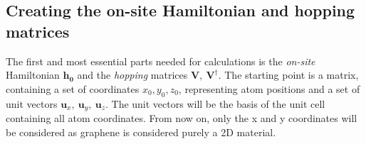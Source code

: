 \subsection{Creating the on-site Hamiltonian and hopping matrices}
The first and most essential parts needed for calculations is the \textit{on-site} Hamiltonian \(\mathbf{h_0}\) and the \textit{hopping} matrices \(\mathbf{V},\ \mathbf{V}^{\dagger}\). The starting point is a matrix, containing a set of coordinates \(x_0,y_0,z_0\), representing atom positions and a set of unit vectors \(\mathbf{u}_x, \ \mathbf{u}_y, \ \mathbf{u}_z\). The unit vectors will be the basis of the unit cell containing all atom coordinates. From now on, only the x and y coordinates will be considered as graphene is considered purely a 2D material.
